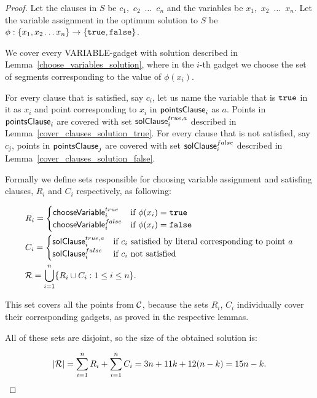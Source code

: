 \begin{proof}
Let the clauses in $S$ be $c_1$,~$c_2$~$\ldots$~$c_n$
and the variables be $x_1$,~$x_2$~$\ldots$~$x_n$.
Let the variable assignment in
the optimum solution to $S$ be
$\phi : \{ x_1, x_2 \ldots x_n\} \rightarrow \{\texttt{true}, \texttt{false}\}$.


We cover every VARIABLE-gadget with solution described in
Lemma~\ref{choose_variables_solution}, where
in the $i$-th gadget we choose the set of segments corresponding to the
value of $\phi(x_i)$.

For every clause that is satisfied, say $c_i$, 
let us name the variable that is $\texttt{true}$ in it as $x_i$
and point corresponding to $x_i$ in $\mathsf{pointsClause}_i$ as $a$.
Points in $\mathsf{pointsClause}_i$ 
are covered with set $\mathsf{solClause}^{true,a}_i$ described in
Lemma~\ref{cover_clauses_solution_true}.
For every clause that is not satisfied, say $c_j$,
points in $\mathsf{pointsClause}_j$ are covered
with set $\mathsf{solClause}^{false}_i$ described in
Lemma~\ref{cover_clauses_solution_false}.

Formally we define 
sets responsible for choosing variable assignment and satisfing clauses,
$R_i$ and $C_i$ respectively, as following:

\begin{align}
	\begin{split}
	& R_i = \begin{cases}
		\mathsf{chooseVariable}^{true}_{i} & \text{if}\ \phi(x_i) = \texttt{true} \\
		\mathsf{chooseVariable}^{false}_{i} & \text{if}\ \phi(x_i) = \texttt{false} \\
		\end{cases} \\
	& C_i = \begin{cases}
		\mathsf{solClause}^{true,a}_i & \text{if}\ c_i \text{ satisfied by literal corresponding to point } a \\
		\mathsf{solClause}^{false}_i & \text{if}\ c_i \text{ not satisfied}
		\end{cases} \\
	& \mathcal{R} = \bigcup\limits_{i=1}^{n} \{R_i \cup C_i : 1 \le i \le n\}.
    \end{split}
\end{align}


This set covers all the points from $\mathcal{C}$, because
the sets $R_i$, $C_i$ individually cover their corresponding gadgets,
as proved in the respective lemmas.

All of these sets are disjoint, so the size of the obtained solution is:

$$|\mathcal{R}| = \sum_{i=1}^{n} R_i + \sum_{i=1}^n C_i = 3n + 11k + 12(n-k) = 15n - k.\qedhere$$
\end{proof}

